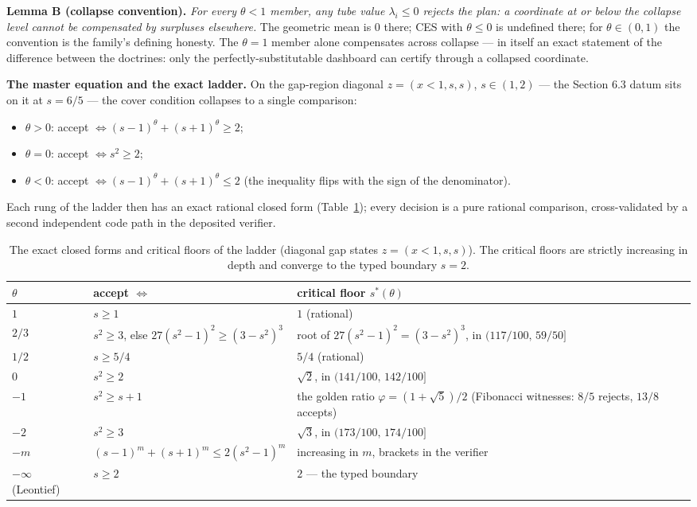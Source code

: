 \documentclass[3p,11pt]{elsarticle}
\providecommand{\tightlist}{\setlength{\itemsep}{0pt}\setlength{\parskip}{0pt}}
\begin{document}
\textbf{Lemma B (collapse convention).} \emph{For every \(\theta < 1\)
member, any tube value \(\lambda_i \le 0\) rejects the plan: a
coordinate at or below the collapse level cannot be compensated by
surpluses elsewhere.} The geometric mean is \(0\) there; CES with
\(\theta \le 0\) is undefined there; for \(\theta \in (0,1)\) the
convention is the family's defining honesty. The \(\theta = 1\) member
alone compensates across collapse --- in itself an exact statement of the
difference between the doctrines: only the perfectly-substitutable
dashboard can certify through a collapsed coordinate.

\textbf{The master equation and the exact ladder.} On the gap-region
diagonal \(z = (x < 1, s, s)\), \(s \in (1, 2)\) --- the Section 6.3
datum sits on it at \(s = 6/5\) --- the cover condition collapses to a
single comparison:

\begin{itemize}
\tightlist
\item
  \(\theta > 0\): accept \(\iff (s-1)^\theta + (s+1)^\theta \ge 2\);
\item
  \(\theta = 0\): accept \(\iff s^2 \ge 2\);
\item
  \(\theta < 0\): accept \(\iff (s-1)^\theta + (s+1)^\theta \le 2\)
  (the inequality flips with the sign of the denominator).
\end{itemize}

Each rung of the ladder then has an exact rational closed form
(Table~\ref{tab:sigmaladder}); every decision is a pure rational
comparison, cross-validated by a second independent code path in the
deposited verifier.

\begin{table}[htbp]
\centering
\small
\caption{The exact closed forms and critical floors of the ladder
(diagonal gap states \(z = (x < 1, s, s)\)). The critical floors are
strictly increasing in depth and converge to the typed boundary \(s = 2\).}
\label{tab:sigmaladder}
\begin{tabular}{@{}lp{4.6cm}p{4.9cm}@{}}
\toprule
\(\theta\) & accept \(\iff\) & critical floor \(s^*(\theta)\) \\
\midrule
\(1\) & \(s \ge 1\) & \(1\) (rational) \\
\(2/3\) & \(s^2 \ge 3\), else \(27(s^2-1)^2 \ge (3-s^2)^3\) & root of \(27(s^2-1)^2 = (3-s^2)^3\), in \((117/100,\, 59/50]\) \\
\(1/2\) & \(s \ge 5/4\) & \(5/4\) (rational) \\
\(0\) & \(s^2 \ge 2\) & \(\sqrt{2}\), in \((141/100,\, 142/100]\) \\
\(-1\) & \(s^2 \ge s + 1\) & the golden ratio \(\varphi = (1+\sqrt{5})/2\) (Fibonacci witnesses: \(8/5\) rejects, \(13/8\) accepts) \\
\(-2\) & \(s^2 \ge 3\) & \(\sqrt{3}\), in \((173/100,\, 174/100]\) \\
\(-m\) & \((s-1)^m + (s+1)^m \le 2(s^2-1)^m\) & increasing in \(m\), brackets in the verifier \\
\(-\infty\) (Leontief) & \(s \ge 2\) & \(2\) --- the typed boundary \\
\bottomrule
\end{tabular}
\end{table}
\end{document}
